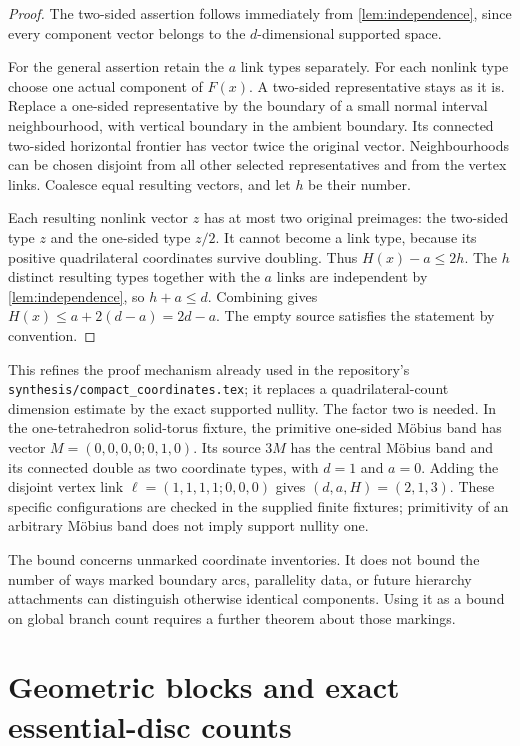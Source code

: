 \documentclass[11pt,a4paper]{article}
\theoremstyle{definition}
\newcommand{\code}[1]{{\small\nolinkurl{#1}}}
\begin{document}
\begin{proof}
The two-sided assertion follows immediately from \cref{lem:independence},
since every component vector belongs to the $d$-dimensional supported space.

For the general assertion retain the $a$ link types separately.  For each
nonlink type choose one actual component of $F(x)$.  A two-sided representative
stays as it is.  Replace a one-sided representative by the boundary of a small
normal interval neighbourhood, with vertical boundary in the ambient boundary.
Its connected two-sided horizontal frontier has vector twice the original
vector.  Neighbourhoods can be chosen disjoint from all
other selected representatives and from the vertex links.  Coalesce equal
resulting vectors, and let $h$ be their number.

Each resulting nonlink vector $z$ has at most two original preimages: the
two-sided type $z$ and the one-sided type $z/2$.  It cannot become a link type,
because its positive quadrilateral coordinates survive doubling.  Thus
$H(x)-a\le2h$.  The $h$ distinct resulting types together with the $a$ links
are independent by \cref{lem:independence}, so $h+a\le d$.  Combining gives
$H(x)\le a+2(d-a)=2d-a$.  The empty source satisfies the statement by convention.
\end{proof}

This refines the proof mechanism already used in the repository's
\code{synthesis/compact_coordinates.tex}; it replaces a quadrilateral-count
dimension estimate by the exact supported nullity.  The factor two is needed.
In the one-tetrahedron solid-torus fixture, the primitive one-sided M\"obius
band has vector $M=(0,0,0,0;0,1,0)$.  Its source $3M$ has the central M\"obius
band and its connected double as two coordinate types, with $d=1$ and $a=0$.
Adding the disjoint vertex link $\ell=(1,1,1,1;0,0,0)$ gives
$(d,a,H)=(2,1,3)$.  These specific configurations are checked in the supplied
finite fixtures; primitivity of an arbitrary M\"obius band does not imply
support nullity one.

The bound concerns unmarked coordinate inventories.  It does not bound the
number of ways marked boundary arcs, parallelity data, or future hierarchy
attachments can distinguish otherwise identical components.  Using it as
a bound on global branch count requires a further theorem about those markings.

\section{Geometric blocks and exact essential-disc counts}
\label{sec:rays}
\end{document}
